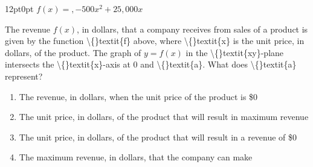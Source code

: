 \documentclass[11pt, twocolumn]{article}
\newcounter{questionnum}
\begin{document}
\vspace{6pt}\noindent
\begin{minipage}{\columnwidth}\raggedright
\noindent{}\par\vspace{8pt}
\begin{adjustwidth}{12pt}{0pt}
$f(x) =, -500 x^{2} + 25,000 x$

The revenue $f(x)$, in dollars, that a company receives from sales of a product is given by the function \textbackslash\{\}textit\{f\} above, where \textbackslash\{\}textit\{x\} is the unit price, in dollars, of the product. The graph of $y = f(x)$ in the \textbackslash\{\}textit\{xy\}-plane intersects the \textbackslash\{\}textit\{x\}-axis at 0 and \textbackslash\{\}textit\{a\}. What does \textbackslash\{\}textit\{a\} represent?
\begin{enumerate}[label=\Alph*),leftmargin=18pt,topsep=3pt,itemsep=2pt]
  \item The revenue, in dollars, when the unit price of the product is \$0
  \item The unit price, in dollars, of the product that will result in maximum revenue
  \item The unit price, in dollars, of the product that will result in a revenue of \$0
  \item The maximum revenue, in dollars, that the company can make
\end{enumerate}
\end{adjustwidth}
\end{minipage}\par
\end{document}
